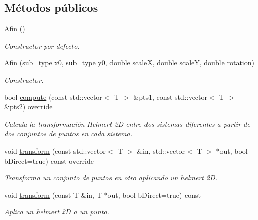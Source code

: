\subsection*{Métodos públicos}
\begin{DoxyCompactItemize}
\item 
\hyperlink{class_i3_d_1_1_afin_ac54cf2d2c5335e8b05449ff56d2fd5fd}{Afin} ()
\begin{DoxyCompactList}\small\item\em Constructor por defecto. \end{DoxyCompactList}\item 
\hyperlink{class_i3_d_1_1_afin_a31d016fd7f21eb6d3532915d258680e7}{Afin} (\hyperlink{class_i3_d_1_1_transform_ac087b4b8b9acb1b11a6caa2231d598c7}{sub\+\_\+type} \hyperlink{class_i3_d_1_1_afin_aff62b2c4443c19c78940f4113e67183b}{x0}, \hyperlink{class_i3_d_1_1_transform_ac087b4b8b9acb1b11a6caa2231d598c7}{sub\+\_\+type} \hyperlink{class_i3_d_1_1_afin_ac687b5efb2b75262c7aeeb31a2792c34}{y0}, double scaleX, double scaleY, double rotation)
\begin{DoxyCompactList}\small\item\em Constructor. \end{DoxyCompactList}\item 
bool \hyperlink{group__trf2_d_group_gabe12d714c522dd1bf40f05f28c5aafe0}{compute} (const std\+::vector$<$ T $>$ \&pts1, const std\+::vector$<$ T $>$ \&pts2) override
\begin{DoxyCompactList}\small\item\em Calcula la transformación Helmert 2D entre dos sistemas diferentes a partir de dos conjuntos de puntos en cada sistema. \end{DoxyCompactList}\item 
void \hyperlink{group__trf2_d_group_gae1b65d232072a70d58ec72492a430521}{transform} (const std\+::vector$<$ T $>$ \&in, std\+::vector$<$ T $>$ $\ast$out, bool b\+Direct=true) const  override
\begin{DoxyCompactList}\small\item\em Transforma un conjunto de puntos en otro aplicando un helmert 2D. \end{DoxyCompactList}\item 
void \hyperlink{group__trf2_d_group_gaf2fb5278c5648034ef5f20c526866b77}{transform} (const T \&in, T $\ast$out, bool b\+Direct=true) const 
\begin{DoxyCompactList}\small\item\em Aplica un helmert 2D a un punto. \end{DoxyCompactList}\item 

\end{DoxyCompactItemize}
